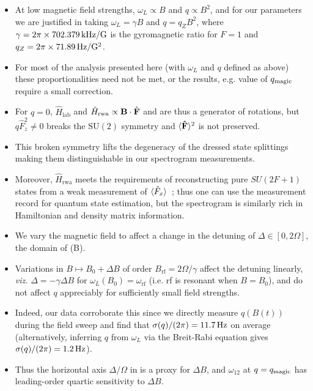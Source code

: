 \documentclass[aps,prl,reprint,superscriptaddress,floatfix]{revtex4-1}
\begin{document}
\begin{itemize}
    \item At low magnetic field strengths, $\omega_L \propto B$ and $q \propto B^2$, and for our parameters we are justified in taking $\omega_L = \gamma B$ and $q = q_Z B^2$, where $\gamma = 2\pi \times \unit[702.379]{kHz/G}$ is the gyromagnetic ratio for \Rb $F=1$ and $q_Z = 2\pi \times \unit[71.89]{Hz/G^2}$.
    \item For most of the analysis presented here (with $\omega_L$ and $q$ defined as above) these proportionalities need not be met, or the results, e.g. value of $q_{\text{magic}}$ require a small correction. 
    \item For $q=0$, $\hat{H}_{\text{lab}}$ and $\hat{H}_{\text{rwa}} \propto \mathbf{B} \cdot \hat{\mathbf{F}}$ and are thus a generator of rotations, but $q \hat{F}_z^2 \neq 0$ breaks the $\text{SU}(2)$ symmetry and $\langle \mathbf{\hat{F}} \rangle^2$ is not preserved.
    \item This broken symmetry lifts the degeneracy of the dressed state splittings making them distinguishable in our spectrogram measurements.
    \item Moreover, $\hat{H}_{\text{rwa}}$ meets the requirements of reconstructing pure $SU(2F+1)$ states from a weak measurement of $\langle \hat{F}_x \rangle$~\cite{merkel_random_2010}; thus one can use the measurement record for quantum state estimation, but the spectrogram is similarly rich in Hamiltonian and density matrix information. 
    \item We vary the magnetic field to affect a change in the detuning of $\Delta \in [0, 2\Omega]$, the domain of (B).
    \item Variations in $B \mapsto B_0 + \Delta B$ of order $B_{\text{rf}} = 2\Omega/\gamma$ affect the detuning linearly, \textit{viz.} $\Delta = - \gamma \Delta B$ for $\omega_L(B_0) = \omega_{\text{rf}}$ (i.e. rf is resonant when $B=B_0$), and do not affect $q$ appreciably for sufficiently small field strengths.
        \item Indeed, our data corroborate this since we directly measure $q(B(t))$ during the field sweep and find that $\sigma(q)/(2\pi) = \unit[11.7]{Hz}$ on average (alternatively, inferring $q$ from $\omega_L$ via the Breit-Rabi equation gives $\sigma(q)/(2\pi) = \unit[1.2]{Hz}$).
    \item Thus the horizontal axis $\Delta/\Omega$ in  is a proxy for $\Delta B$, and $\omega_{12}$ at $q=q_{\text{magic}}$ has leading-order quartic sensitivity to $\Delta B$.

\end{itemize}
\end{document}
